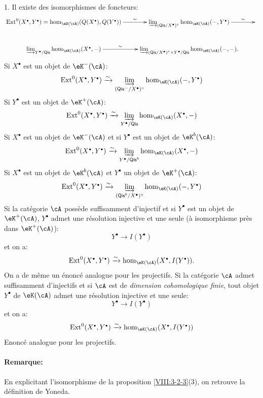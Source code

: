 \begin{proposition}\label{VIII:3-2-3}
1. Il existe des isomorphismes de foncteurs: 
\[\xymatrix{
  \ext^0(X^\bullet,Y^\bullet) = \hom_{\eD(\cA)}(Q(X^\bullet),Q(Y^\bullet)) \ar[r]^-\sim 
    & \varinjlim_{(\mathsf{Qis}/X^\bullet)^\circ} \hom_{\eK(\cA)}(-,Y^\bullet) \ar[r]^-\sim 
    & \\
  \varinjlim_{Y^\bullet/\mathsf{Qis}} \hom_{\eK(\cA)}(X^\bullet,-) \ar[r]^-\sim 
    & \varinjlim_{(\mathsf{Qis}/X^\bullet)^\circ \times Y^\bullet/\mathsf{Qis}} \hom_{\eK(\cA)}(-,-) \text{.}
}\]
Si $X^\bullet$ est un objet de $\eK^-(\cA)$: 
\[
  \ext^0(X^\bullet,Y^\bullet) \iso \varinjlim_{(\mathsf{Qis}^-/X^\bullet)^\circ} \hom_{\eK(\cA)}(-,Y^\bullet) 
\]
Si $Y^\bullet$ est un objet de $\eK^+(\cA)$: 
\[
  \ext^0(X^\bullet,Y^\bullet) \iso \varinjlim_{Y^\bullet/\mathsf{Qis}} \hom_{\eK(\cA)}(X^\bullet,-) 
\]
Si $X^\bullet$ est un objet de $\eK^-(\cA)$ et si $Y^\bullet$ est un 
objet de $\eK^b(\cA)$: 
\[
  \ext^0(X^\bullet,Y^\bullet) \iso \varinjlim_{Y^\bullet/\mathsf{Qis}^b} \hom_{\eK(\cA)}(X^\bullet,-) 
\]
Si $X^\bullet$ est un objet de $\eK^b(\cA)$ et $Y^\bullet$ un objet de 
$\eK^+(\cA)$: 
\[
  \ext^0(X^\bullet,Y^\bullet) \iso \varinjlim_{(\mathsf{Qis}^b/X^\bullet)^\circ} \hom_{\eK(\cA)}(-,Y^\bullet) 
\]
Si la catégorie $\cA$ possède suffisamment d'injectif et si 
$Y^\bullet$ est un objet de $\eK^+(\cA)$, $Y^\bullet$ admet une 
résolution injective et une seule (à isomorphisme près dans 
$\eK^+(\cA)$): 
\[
  Y^\bullet \to I(Y^\bullet) 
\]
et on a: 
\[
  \ext^0(X^\bullet,Y^\bullet) \iso \hom_{\eK(\cA)}(X^\bullet,I(Y^\bullet)) \text{.}
\]
On a de même un énoncé analogue pour les projectifs. 
Si la catégorie $\cA$ admet suffisamment d'injectifs et si $\cA$ est 
de \emph{dimension cohomologique finie}, tout objet $Y^\bullet$ de 
$\eK(\cA)$ admet une résolution injective et une seule: 
\[
  Y^\bullet \to I(Y^\bullet)
\]
et on a: 
\[
  \ext^0(X^\bullet,Y^\bullet) \iso \hom_{\eK(\cA)}(X^\bullet,I(Y^\bullet)) 
\]
Enoncé analogue pour les projectifs. 
\end{proposition}

\paragraph{Remarque:}
En explicitant l'isomorphisme de la proposition \ref{VIII:3-2-3}(3), on 
retrouve la définition de Yoneda. 










